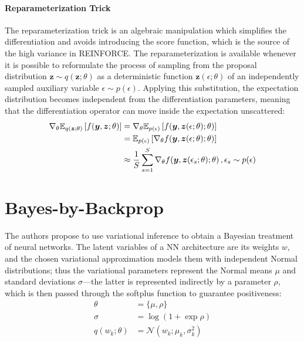 \documentclass[11pt]{article}
\begin{document}
\paragraph{Reparameterization Trick}

The reparameterization trick is an algebraic manipulation which simplifies the
differentiation and avoids introducing the score function, which is the source
of the high variance in REINFORCE\@.  The reparameterization is available
whenever it is possible to reformulate the process of sampling from the
proposal distribution $\bm z\sim q(\bm z; \theta)$ as a deterministic function
$\bm z(\epsilon; \theta)$ of an independently sampled auxiliary variable
$\epsilon\sim p(\epsilon)$.  Applying this substitution, the expectation
distribution becomes independent from the differentiation parameters, meaning
that the differentiation operator can move inside the expectation unscattered:
%
\begin{align}
  \nabla_\theta {\mathbb{E}}_{q(\bm z; \theta)}\left[ f(\bm y, \bm z; \theta) \right]
  &= \nabla_\theta {\mathbb{E}}_{p(\epsilon)}\left[ f(\bm y, \bm z(\epsilon; \theta);
  \theta) \right] \nonumber \\
  &= {\mathbb{E}}_{p(\epsilon)}\left[ \nabla_\theta f(\bm y, \bm z(\epsilon; \theta);
  \theta) \right] \nonumber \\
  &\approx \frac{1}{S} \sum_{s=1}^S \nabla_\theta f(\bm y, \bm z(\epsilon_s;
  \theta); \theta)\,, \epsilon_s \sim p(\epsilon)
\end{align}

\section{Bayes-by-Backprop}\label{sec:bayes_by_backprop}

The authors propose to use variational inference to obtain a Bayesian treatment
of neural networks.  The latent variables of a NN architecture are its weights
$w$, and the chosen variational approximation models them with independent
Normal distributions;  thus the variational parameters represent the Normal
means $\mu$ and standard deviations $\sigma$---the latter is represented
indirectly by a parameter $\rho$, which is then passed through the softplus
function to guarantee positiveness:
%
\begin{align}
  \theta &= \{ \mu, \rho \} \\
  \sigma &= \log(1 + \exp\rho) \\
  q(w_k; \theta) &= \mathcal{N}(w_k; \mu_k, \sigma_k^2)
\end{align}
\end{document}
